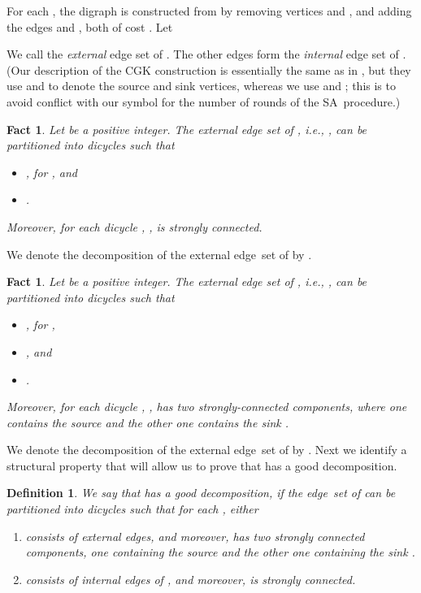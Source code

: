 \documentclass[11pt]{article}
\newtheorem{definition}[theorem]{Definition}
\newtheorem{fact}[theorem]{Fact}
\newcommand{\iSA}{\textsf{SA}}
\begin{document}
For each ,
the digraph  is constructed from  by removing vertices 
and , and adding the edges  and , both of cost
. Let 

 We call 
the \textit{external} edge set of . The other edges form the
\textit{internal} edge set of .
(Our description of the CGK construction is essentially the same
as in \cite{CGK06}, but they use  and  to denote
the source and sink vertices,
whereas we use  and ;
this is to avoid conflict with our symbol 
for the number of rounds of the \iSA\ procedure.)


\begin{fact}
\label{fact:Lk-external}
Let  be a positive integer.
The external edge set of , i.e., , can be
partitioned into  dicycles  such that
\begin{itemize}
\item[]
	, for , and
\item[]
	.
\end{itemize}
Moreover, for each dicycle , ,
 is strongly connected.
\end{fact}

We denote the decomposition of the external edge~set of 
by . 

\begin{fact}
\label{fact:Gk-external}
Let  be a positive integer.
The external edge set of , i.e., , can be
partitioned into  dicycles  such that
\begin{itemize}
\item[]
	, for ,
\item[]
	, and
\item[]
	.
\end{itemize}
Moreover, for each dicycle , ,
 has two strongly-connected components,
where one contains the source  and
the other one contains the sink .
\end{fact}

We denote the decomposition of the external edge~set of 
by . 
Next we identify a structural property that will allow us to prove that  has a good decomposition. 

\begin{definition}\label{def: pq good decomposition}
We say that  has a  good decomposition, if the edge~set of  can be partitioned into
dicycles  such that
for each , either
\begin{enumerate}
\item[(1)]  consists of external edges, 
and moreover,
 has two strongly connected components, one containing
the source  and the other one containing the sink .
\item[(2)]  consists of internal edges of , and moreover,
 is strongly connected.
\end{enumerate}
\end{definition}
\end{document}
